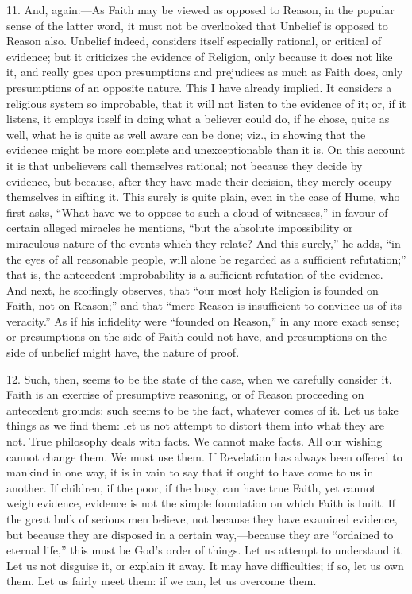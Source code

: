 11. And, again:—As Faith may be viewed as opposed to Reason, in
the popular sense of the latter word, it must not be overlooked that
Unbelief is opposed to Reason also. Unbelief indeed, considers itself
especially rational, or critical of evidence; but it criticizes the
evidence of Religion, only because it does not like it, and really
goes upon presumptions and prejudices as much as Faith does, only
presumptions of an opposite nature. This I have already implied. It
considers a religious system so improbable, that it will not listen to
the evidence of it; or, if it listens, it employs itself in doing what
a believer could do, if he chose, quite as well, what he is quite as
well aware can be done; viz., in showing that the evidence might be
more complete and unexceptionable than it is. On this account it is
that unbelievers call themselves rational; not because they decide by
evidence, but because, after they have made their decision, they
merely occupy themselves in sifting it. This surely is quite plain,
even in the case of Hume, who first asks, ``What have we to oppose
to such a cloud of witnesses,'' in favour of certain alleged
miracles he mentions, ``but the absolute impossibility or
miraculous nature of the events which they relate? And this
surely,'' he adds, ``in the eyes of all reasonable people,
will alone be regarded as a sufficient refutation;'' that is, the
antecedent improbability is a sufficient refutation of the evidence.
And next, he scoffingly observes, that ``our most holy Religion is
founded on Faith, not on Reason;'' and that ``mere Reason is
insufficient to convince us of its veracity.'' As if his
infidelity were ``founded on Reason,'' in any more exact
sense; or presumptions on the side of Faith could not have, and
presumptions on the side of unbelief might have, the nature of proof.

12. Such, then, seems to be the state of the case, when we
carefully consider it. Faith is an exercise of presumptive reasoning,
or of Reason proceeding on antecedent grounds: such seems to be the
fact, whatever comes of it. Let us take things as we find them: let us
not attempt to distort them into what they are not. True philosophy
deals with facts. We cannot make facts. All our wishing cannot change
them. We must use them. If Revelation has always been offered to
mankind in one way, it is in vain to say that it ought to have come to
us in another. If children, if the poor, if the busy, can have true
Faith, yet cannot weigh evidence, evidence is not the simple
foundation on which Faith is built. If the great bulk of serious men
believe, not because they have examined evidence, but because they are
disposed in a certain way,—because they are ``ordained to
eternal life,'' this must be God's order of things. Let us attempt
to understand it. Let us not disguise it, or explain it away. It may
have difficulties; if so, let us own them. Let us fairly meet them: if
we can, let us overcome them.

